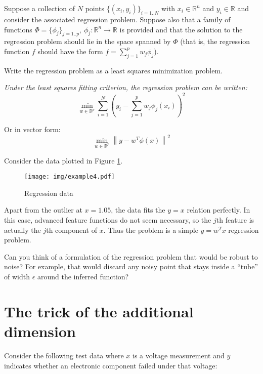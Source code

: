 \documentclass{article}
\begin{document}
Suppose a collection of $N$ points $\{(x_i,y_i)\}_{i=1..N}$ with $x_i\in \mathbb{R}^n$ and $y_i \in \mathbb{R}$ and consider the associated regression problem. Suppose also that a family of functions $\Phi=\{\phi_j\}_{j=1..p}, \ \phi_j:\mathbb{R}^n \rightarrow \mathbb{R}$ is provided and that the solution to the regression problem should lie in the space spanned by $\Phi$ (that is, the regression function $f$ should have the form $f=\sum_{j=1}^p w_j \phi_j$).

\noindent {} Write the regression problem as a least squares minimization problem.

{\it Under the least squares fitting criterion, the regression problem can be written:
\begin{equation*}
\min_{w \in \mathbb{R}^p} \sum\limits_{i=1}^N \left(y_i - \sum_{j=1}^p w_j \phi_j(x_i) \right)^2
\end{equation*}

Or in vector form:
\begin{equation*}
\min_{w \in \mathbb{R}^p} \left\| y - w^T \phi(x) \right\|^2
\end{equation*}
}

Consider the data plotted in Figure \ref{fig:3}. 
\begin{figure}[h!]
\begin{center}
\texttt{[image: img/example4.pdf]}
\end{center}
\caption{Regression data}
\label{fig:3}
\end{figure}

Apart from the outlier at $x=1.05$, the data fits the $y=x$ relation perfectly.
In this case, advanced feature functions do not seem necessary, so the $j$th feature is actually the $j$th component of $x$. Thus the problem is a simple $y=w^Tx$ regression problem.

\noindent {} Can you think of a formulation of the regression problem that would be robust to noise? For example, that would discard any noisy point that stays inside a ``tube'' of width $\epsilon$ around the inferred function?

\section{The trick of the additional dimension}

Consider the following test data where $x$ is a voltage measurement and $y$ indicates whether an electronic component failed under that voltage:
\end{document}
